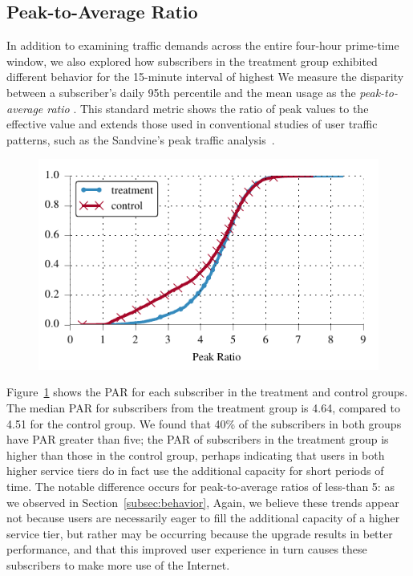 \subsection{Peak-to-Average Ratio}\label{subsec:peakratio}

In addition to examining traffic demands across the entire four-hour
prime-time window, we also explored how subscribers in the treatment
group exhibited different behavior for the 15-minute interval of highest  We measure the disparity
between a subscriber's daily 95th percentile and 
the mean usage as the \emph{peak-to-average ratio}
. This standard metric
shows the ratio of peak values to the effective value and extends those used
in conventional studies of user traffic patterns, such as the Sandvine's
peak traffic analysis~\cite{sandvine20141h}. 

\begin{figure}[t]
\centering
\includegraphics[width=.75\linewidth]{figures/peakratio_cdf_mean-devices.pdf}
\caption{}
\label{fig:CDF-peak-ratio-mean}
\end{figure}

Figure~\ref{fig:CDF-peak-ratio-mean} shows the PAR for each 
subscriber in the treatment and control groups. The median PAR
 for subscribers from the treatment group is 4.64, compared to 4.51
for the control group.
We found that 40\% of the subscribers in both groups have PAR
greater than five; the PAR of subscribers in the treatment group is higher than those in the
control group, perhaps indicating that users in both higher service tiers do
in fact use the additional capacity for short periods of time. The
notable difference occurs for peak-to-average ratios of less-than 5: as
we observed in Section~\ref{subsec:behavior},   Again, we believe these trends
appear not because users are necessarily eager to fill the additional
capacity of a higher service tier, but rather may be occurring because the upgrade
results in better performance, and that this improved user experience in
turn causes these subscribers to make more use of the Internet.

